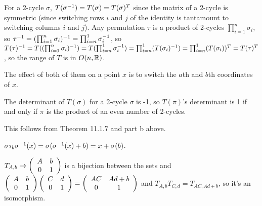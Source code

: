 \documentclass[11pt, oneside]{article}   	%
\begin{document}
\item \be
\item For a 2-cycle $\sigma$, $T(\sigma^{-1}) = T(\sigma) = T(\sigma)^T$ since the matrix of a 2-cycle is symmetric (since switching rows $i$ and $j$ of the identity is tantamount to switching columns $i$ and $j$). Any permutation $\tau$ is a product of 2-cycles $\prod_{i=1}^n\sigma_i$, so $\tau^{-1} = (\prod_{i=1}^n\sigma_i)^{-1} = \prod_{i=n}^1\sigma_i^{-1}$, so $T(\tau)^{-1} = T((\prod_{i=1}^n\sigma_i)^{-1}) = T(\prod_{i=n}^1\sigma_i^{-1}) = \prod_{i=n}^1(T(\sigma_i)^{-1})=\prod_{i=n}^1(T(\sigma_i))^T = T(\tau)^T$, so the range of $T$ is in $O(n,\mathbb{R})$.
\item The effect of both of them on a point $x$ is to switch the $a$th and $b$th coordinates of $x$.
\item The determinant of $T(\sigma)$ for a 2-cycle $\sigma$ is -1, so $T(\pi)$'s determinant is 1 if and only if $\pi$ is the product of an even number of 2-cycles.
\item This follows from Theorem 11.1.7 and part b above.
\ee
\item $\sigma\tau_b\sigma^{-1}(x) = \sigma(\sigma^{-1}(x) + b) = x + \sigma(b)$.
\item $T_{A, b} \to \left( \begin{array}{ccc} A & b \\ 0 & 1 \end{array} \right)$ is a bijection between the sets and $\left( \begin{array}{ccc} A & b \\ 0 & 1 \end{array} \right)\left( \begin{array}{ccc} C & d \\ 0 & 1 \end{array} \right) = \left( \begin{array}{ccc} AC & Ad + b \\ 0 & 1 \end{array} \right)$ and $T_{A, b}T_{C, d} = T_{AC, Ad+b}$, so it's an isomorphism.
\ee
\end{document}
